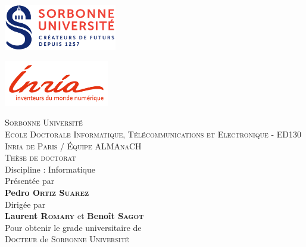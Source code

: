 
\begin{titlepage}

	\begin{center}
		\begin{minipage}[t]{0.4\textwidth}
			\includegraphics[height=2cm]{static/media/sorbonne}
		\end{minipage}%
		\hfill
		\begin{minipage}[t]{0.4\textwidth}
			\hfill
			\includegraphics[height=2cm]{static/media/inria}
		\end{minipage}

		\vspace{0.2cm}
		\LARGE \textsc{Sorbonne Université}\\
		\vspace{0.2cm}
		\normalsize \textsc{Ecole Doctorale Informatique, Télécommunications et Electronique} - ED130\\
		\vspace{0.2cm}
		\textsc{Inria de Paris / Équipe ALMAnaCH}\\

		\vspace{0.4cm}
		\Large \textsc{Thèse de doctorat}\\
		\normalsize Discipline : Informatique\\
		\vspace{0.4cm}
		\normalsize Présentée par \\
		\LARGE \textbf{Pedro \textsc{Ortiz Suarez}}\\
		\vspace{0.4cm}
		\normalsize Dirigée par \\
		\Large \textbf{Laurent \textsc{Romary}} et \textbf{Benoît \textsc{Sagot}}\\
		\vspace{0.4cm}
		\normalsize Pour obtenir le grade universitaire de\\
		\Large \textsc{Docteur} de \textsc{Sorbonne Université}


\end{center}
\end{titlepage}
